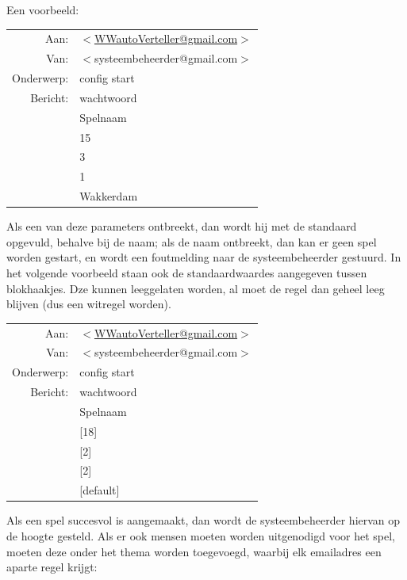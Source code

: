 \documentclass[12pt]{article}
\begin{document}
    Een voorbeeld:
    
    \begin{center}
      \begin{tabularx}{0.75\textwidth}[c]{|r X|}
	\hline
	Aan: & \href{mailto:<WWautoVerteller@gmail.com>}{$<$WWautoVerteller@gmail.com$>$} \\
	Van: & $<$systeembeheerder@gmail.com$>$ \\
	Onderwerp: & config start \\[\baselineskip]	
	Bericht: & wachtwoord \\
	 & Spelnaam \\
	 & 15 \\
	 & 3 \\
	 & 1 \\
	 & Wakkerdam \\
	\hline
      \end{tabularx}
    \end{center}
    
    Als een van deze parameters ontbreekt, dan wordt hij met de standaard opgevuld, behalve bij de naam; als de naam ontbreekt, dan kan er geen spel worden gestart, en wordt een foutmelding naar de systeembeheerder gestuurd. In het volgende voorbeeld staan ook de standaardwaardes aangegeven tussen blokhaakjes. Dze kunnen leeggelaten worden, al moet de regel dan geheel leeg blijven (dus een witregel worden).
    
    \begin{center}
      \begin{tabularx}{0.75\textwidth}[c]{|r X|}
	\hline
	Aan: & \href{mailto:<WWautoVerteller@gmail.com>}{$<$WWautoVerteller@gmail.com$>$} \\
	Van: & $<$systeembeheerder@gmail.com$>$ \\
	Onderwerp: & config start \\[\baselineskip]	
	Bericht: & wachtwoord \\
	 & Spelnaam \\
	 & [18] \\
	 & [2] \\
	 & [2] \\
	 & [default] \\
	\hline
      \end{tabularx}
    \end{center}
    
    Als een spel succesvol is aangemaakt, dan wordt de systeembeheerder hiervan op de hoogte gesteld. Als er ook mensen moeten worden uitgenodigd voor het spel, moeten deze onder het thema worden toegevoegd, waarbij elk emailadres een aparte regel krijgt:
    
\end{document}
